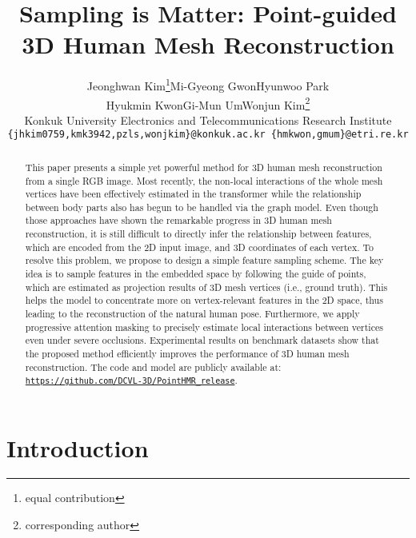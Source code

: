 \documentclass[10pt,twocolumn,letterpaper]{article}
\begin{document}
\title{Sampling is Matter: Point-guided 3D Human Mesh Reconstruction}

\author{Jeonghwan Kim\thanks{equal contribution}\quad Mi-Gyeong Gwon\footnotemark[1]\quad Hyunwoo Park\quad \\
Hyukmin Kwon\quad Gi-Mun Um\quad Wonjun Kim\thanks{corresponding author}\\
Konkuk University \quad Electronics and Telecommunications Research Institute\\
{\tt\small \{jhkim0759,kmk3942,pzls,wonjkim\}@konkuk.ac.kr \quad \{hmkwon,gmum\}@etri.re.kr}
}
\maketitle


\begin{abstract}
   This paper presents a simple yet powerful method for 3D human mesh reconstruction from a single RGB image.
   Most recently, the non-local interactions of the whole mesh vertices have been effectively estimated in the transformer while the relationship 
   between body parts also has begun to be handled via the graph model.
   Even though those approaches have shown the remarkable progress in 3D human mesh reconstruction, it is still difficult to directly infer the 
   relationship between features, which are encoded from the 2D input image, and 3D coordinates of each vertex.
   To resolve this problem, we propose to design a simple feature sampling scheme.
   The key idea is to sample features in the embedded space by following the guide of points, which are estimated as projection results of 3D mesh 
   vertices (i.e., ground truth). This helps the model to concentrate more on vertex-relevant features in the 2D space, thus leading to the 
   reconstruction of the natural human pose. Furthermore, we apply progressive attention masking to precisely estimate local interactions between 
   vertices even under severe occlusions. Experimental results on benchmark datasets show that the proposed method efficiently improves the 
   performance of 3D human mesh reconstruction.
The code and model are publicly available at: \href{https://github.com/DCVL-3D/PointHMR_release}{\nolinkurl{https://github.com/DCVL-3D/PointHMR\_release}}.
\end{abstract}

\section{Introduction}
\label{sec:intro}
\end{document}
